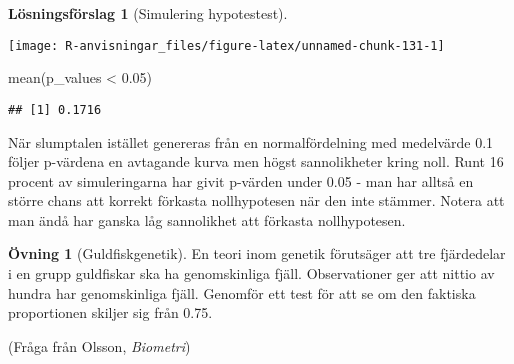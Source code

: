 \documentclass[
]{book}
\newenvironment{Shaded}{\begin{snugshade}}{\end{snugshade}}
\newcommand{\AttributeTok}[1]{\textcolor[rgb]{0.77,0.63,0.00}{#1}}
\newcommand{\ControlFlowTok}[1]{\textcolor[rgb]{0.13,0.29,0.53}{\textbf{#1}}}
\newcommand{\DecValTok}[1]{\textcolor[rgb]{0.00,0.00,0.81}{#1}}
\newcommand{\FloatTok}[1]{\textcolor[rgb]{0.00,0.00,0.81}{#1}}
\newcommand{\FunctionTok}[1]{\textcolor[rgb]{0.00,0.00,0.00}{#1}}
\newcommand{\NormalTok}[1]{#1}
\newcommand{\OtherTok}[1]{\textcolor[rgb]{0.56,0.35,0.01}{#1}}
\newcommand{\SpecialCharTok}[1]{\textcolor[rgb]{0.00,0.00,0.00}{#1}}
\theoremstyle{definition}
\theoremstyle{definition}
\theoremstyle{definition}
\newtheorem{exercise}{Övning}[chapter]
\theoremstyle{definition}
\newtheorem{hypothesis}{Lösningsförslag}[chapter]
\theoremstyle{remark}
\begin{document}
\begin{hypothesis}[Simulering hypotestest]
\begin{Shaded}
\end{Shaded}

\begin{center}\texttt{[image: R-anvisningar\_files/figure-latex/unnamed-chunk-131-1]} \end{center}

\begin{Shaded}
\begin{Highlighting}[]
\FunctionTok{mean}\NormalTok{(p\_values }\SpecialCharTok{\textless{}} \FloatTok{0.05}\NormalTok{)}
\end{Highlighting}
\end{Shaded}

\begin{verbatim}
## [1] 0.1716
\end{verbatim}

När slumptalen istället genereras från en normalfördelning med medelvärde 0.1 följer p-värdena en avtagande kurva men högst sannolikheter kring noll. Runt 16 procent av simuleringarna har givit p-värden under 0.05 - man har alltså en större chans att korrekt förkasta nollhypotesen när den inte stämmer. Notera att man ändå har ganska låg sannolikhet att förkasta nollhypotesen.
\end{hypothesis}

\begin{exercise}[Guldfiskgenetik]
En teori inom genetik förutsäger att tre fjärdedelar i en grupp guldfiskar ska ha genomskinliga fjäll. Observationer ger att nittio av hundra har genomskinliga fjäll. Genomför ett test för att se om den faktiska proportionen skiljer sig från 0.75.

(Fråga från Olsson, \emph{Biometri})
\end{exercise}
\end{document}
